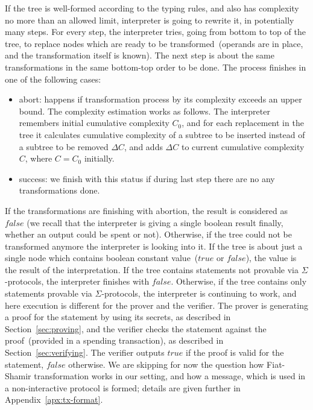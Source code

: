 \documentclass[]{llncs}
\begin{document}
If the tree is well-formed according to the typing rules, and also has complexity no more than an allowed limit, interpreter is going to rewrite it, in potentially many steps. For every step, the interpreter tries, going from bottom to top of the tree, to replace nodes which are ready to be transformed~(operands are in place, and the transformation itself is known). The next step is about the same transformations in the same bottom-top order to be done. The process finishes in one of the following cases:

\begin{itemize}
    \item{abort: } happens if transformation process by its complexity exceeds an upper bound. The complexity estimation works as follows. The interpreter remembers initial cumulative complexity $C_0$, and for each replacement in the tree it calculates cumulative complexity of a subtree to be inserted instead of a subtree to be removed $\Delta C$, and adds $\Delta C$ to current cumulative complexity $C$, where $C = C_0$ initially.  
    \item{success: } we finish with this status if during last step there are no any transformations done.  
\end{itemize} 

If the transformations are finishing with abortion, the result is considered as $false$ (we recall that the interpreter is giving a single boolean result finally, whether an output could be spent or not). Otherwise, if the tree could not be transformed anymore the interpreter is looking into it. If the tree is about just a single node which contains boolean constant value~($true$ or $false$), the value is the result of the interpretation. If the tree contains statements not provable via $\Sigma$-protocols, the interpreter finishes with $false$. Otherwise, if the tree contains only statements provable via $\Sigma$-protocols, the interpreter is continuing to work, and here execution is different for the prover and the verifier. The prover is generating a proof for the statement by using its secrets, as described in Section~\ref{sec:proving}, and the verifier checks the statement against the proof~(provided in a spending transaction), as described in Section~\ref{sec:verifying}. The verifier outputs $true$ if the proof is valid for the statement, $false$ otherwise. We are skipping for now the question how Fiat-Shamir transformation works in our setting, and how a message, which is used in a non-interactive protocol is formed; details are given further in Appendix~\ref{apx:tx-format}. 
\end{document}
